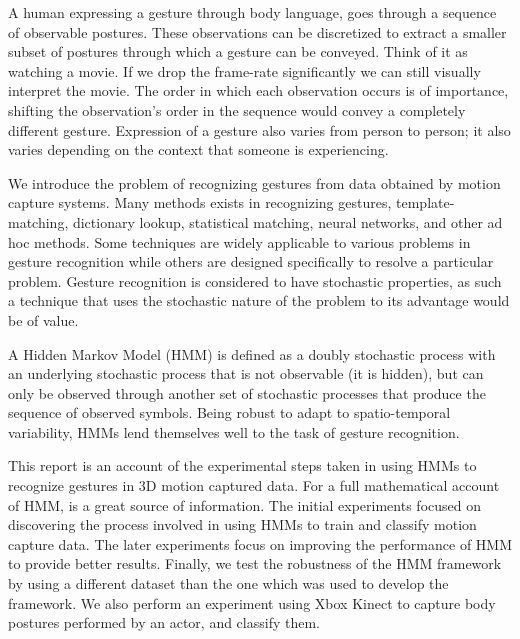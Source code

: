 \documentclass[]{report}   %
\begin{document}
A human expressing a gesture through body language, goes through a sequence of observable postures. These observations can be discretized to extract a smaller subset of postures through which a gesture can be conveyed. Think of it as watching a movie. If we drop the frame-rate significantly we can still visually interpret the movie. The order in which each observation occurs is of importance, shifting the observation's order in the sequence would convey a completely different gesture. Expression of a gesture also varies from person to person; it also varies depending on the context that someone is experiencing.

We introduce the problem of recognizing gestures from data obtained by motion capture systems. Many methods exists in recognizing gestures\cite{4154947, Yang_1994_329}, template-matching, dictionary lookup, statistical matching, neural networks, and other ad hoc methods. Some techniques are widely applicable to various problems in gesture recognition while others are designed specifically to resolve a particular problem. Gesture recognition is considered to have stochastic properties\cite{Yang_1994_329}, as such a technique that uses the stochastic nature of the problem to its advantage would be of value.

A Hidden Markov Model (HMM) is defined as a doubly stochastic process with an underlying stochastic process that is not observable (it is hidden), but can only be observed through another set of stochastic processes that produce the sequence of observed symbols\cite{1165342}. Being robust to adapt to spatio-temporal variability\cite{springerlink:10.1007/s00422-004-0516-0}, HMMs lend themselves well to the task of gesture recognition.

This report is an account of the experimental steps taken in using HMMs to recognize gestures in 3D motion captured data. For a full mathematical account of HMM, \citet{1165342} is a great source of information. The initial experiments focused on discovering the process involved in using HMMs to train and classify motion capture data. The later experiments focus on improving the performance of HMM to provide better results. Finally, we test the robustness of the HMM framework by using a different dataset than the one which was used to develop the framework. We also perform an experiment using Xbox Kinect to capture body postures performed by an actor, and classify them.
\end{document}
